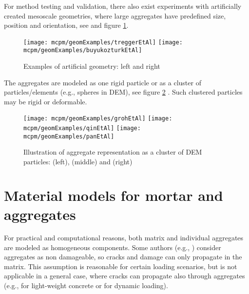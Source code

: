 For method testing and validation, there also exist experiments with artificially created mesoscale geometries, where large aggregates have predefined size, position and orientation, see
\cite{%
	TreggerCorrGrahambradyShah2006a,%
	BuyukozturkHearing1998%
} and figure \ref{figMCPMLitratureMesoGeometryArtificial}.
\begin{figure}[ht]
	\centering
	\texttt{[image: mcpm/geomExamples/treggerEtAl]}
	\hspace{10mm}
	\texttt{[image: mcpm/geomExamples/buyukozturkEtAl]}
	\caption[Examples of artificial geometry]{Examples of artificial geometry: \cite{TreggerCorrGrahambradyShah2006a} left and \cite{BuyukozturkHearing1998} right}
	\label{figMCPMLitratureMesoGeometryArtificial}
\end{figure}

The aggregates are modeled as one rigid particle
\cite{%
	GuHongWangLin2013a,%
	WangLinGu2008a,%
	YipLiLiaoBolander2006a,%
	LandisBolander2009a,%
	AsahinaLandisBolander2011a%
} or as a cluster of particles/elements (e.g., spheres in DEM), see figure \ref{figMCPMClusters}
\cite{%
	AzevedoLemosAlmeida2008a,%
	GrasslJirasek2010a,%
	GrasslRempling2008a,%
	GrohKonietzkyWalterHerbst2011a,%
	KimAlrub2011a,%
	PanFengJinXuSunZhangOwen2013a,%
	QinZhang2011a%
}.
Such clustered particles may be rigid or deformable.
\begin{figure}%
	\centering
	\texttt{[image: mcpm/geomExamples/grohEtAl]}
	\hspace{5mm}
	\texttt{[image: mcpm/geomExamples/qinEtAl]}
	\hspace{5mm}
	\texttt{[image: mcpm/geomExamples/panEtAl]}
	\caption[Illustration of aggregate representation as a cluster of DEM particles]{
		Illustration of aggregate representation as a cluster of DEM particles:
		\cite{GrohKonietzkyWalterHerbst2011a} (left),
		\cite{QinZhang2011a} (middle)
		and
		\cite{PanFengJinXuSunZhangOwen2013a} (right)
	}
	\label{figMCPMClusters}
\end{figure}

\section{Material models for mortar and aggregates}
For practical and computational reasons, both matrix and individual aggregates are modeled as homogeneous components.
Some authors (e.g.,
\cite{%
	CaballeroWillamCarol2008a,%
	CombypeyrotBernardBouchardBayGarciadiaz2009a,%
	Cusatis2001a,%
	GhoshChaudhuri2013a,%
	GrasslJirasek2010a,%
	GrasslRempling2008a,%
	GuHongWangLin2013a%
})
consider aggregates as non damageable, so cracks and damage can only propagate in the matrix.
This assumption is reasonable for certain loading scenarios, but is not applicable in a general case, where cracks can propagate also through aggregates (e.g., for light-weight concrete or for dynamic loading).

